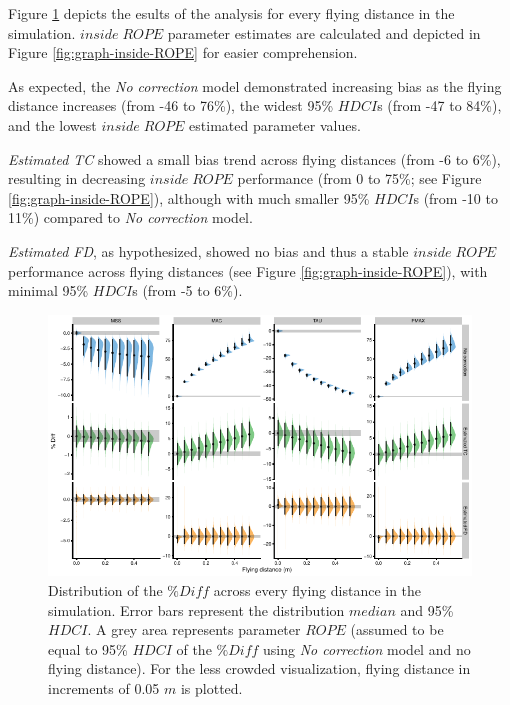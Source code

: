 \documentclass[fleqn,10pt,lineno]{wlpeerj} %
\begin{document}
Figure \ref{fig:graph-per-FD} depicts the esults of the analysis for every flying distance in the simulation. \(inside \; ROPE\) parameter estimates are calculated and depicted in Figure \ref{fig:graph-inside-ROPE} for easier comprehension.

As expected, the \emph{No correction} model demonstrated increasing bias as the flying distance increases (from -46 to 76\%), the widest 95\% \(HDCI\)s (from -47 to 84\%), and the lowest \(inside \; ROPE\) estimated parameter values.

\emph{Estimated TC} showed a small bias trend across flying distances (from -6 to 6\%), resulting in decreasing \(inside \; ROPE\) performance (from 0 to 75\%; see Figure \ref{fig:graph-inside-ROPE}), although with much smaller 95\% \(HDCI\)s (from -10 to 11\%) compared to \emph{No correction} model.

\emph{Estimated FD}, as hypothesized, showed no bias and thus a stable \(inside \; ROPE\) performance across flying distances (see Figure \ref{fig:graph-inside-ROPE}), with minimal 95\% \(HDCI\)s (from -5 to 6\%).



\begin{figure}

{\centering \includegraphics[width=0.9\linewidth]{shorts-simulation-paper_files/figure-latex/graph-per-FD-1} 

}

\caption{Distribution of the \(\%Diff\) across every flying distance in the simulation. Error bars represent the distribution \(median\) and 95\% \(HDCI\). A grey area represents parameter \(ROPE\) (assumed to be equal to 95\% \(HDCI\) of the \(\%Diff\) using \emph{No correction} model and no flying distance). For the less crowded visualization, flying distance in increments of 0.05 \(m\) is plotted.}\label{fig:graph-per-FD}
\end{figure}
\end{document}
